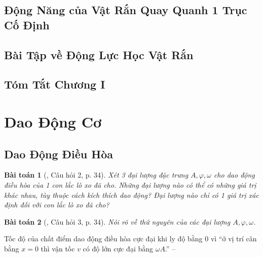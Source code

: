 \documentclass{article}
\numberwithin{equation}{section}
\newtheorem{baitoan}{Bài toán}[section]
\begin{document}

\subsection{Động Năng của Vật Rắn Quay Quanh 1 Trục Cố Định}


\subsection{Bài Tập về Động Lực Học Vật Rắn}


\subsection{Tóm Tắt Chương I}


\newpage
\section{Dao Động Cơ}

\subsection{Dao Động Điều Hòa}

\begin{baitoan}[\cite{SGK_Vat_Ly_12_nang_cao}, Câu hỏi 2, p. 34]
	Xét 3 đại lượng đặc trưng $A,\varphi,\omega$ cho dao động điều hòa của 1 con lắc lò xo đã cho. Những đại lượng nào có thể có những giá trị khác nhau, tùy thuộc cách kích thích dao động? Đại lượng nào chỉ có 1 giá trị xác định đối với con lắc lò xo đã cho?
\end{baitoan}

\begin{baitoan}[\cite{SGK_Vat_Ly_12_nang_cao}, Câu hỏi 3, p. 34]
	Nói rõ về thứ nguyên của các đại lượng $A,\varphi,\omega$.
\end{baitoan}
Tốc độ của chất điểm dao động điều hòa cực đại khi ly độ bằng $0$ vì ``ở vị trí cân bằng $x = 0$ thì vận tốc $v$ có độ lớn cực đại bằng $\omega A$.'' -- \cite[p. 32]{SGK_Vat_Ly_12_nang_cao}
\end{document}

